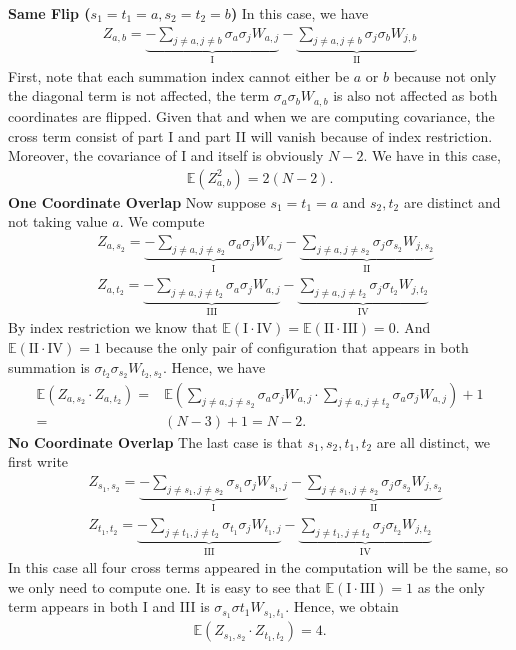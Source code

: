 \documentclass[10pt]{article}
\newcommand{\e}{\mathbb{E}}
\newenvironment{Proof of lemma}{\noindent{\bf Proof of Lemma}}{\hfill$\Box$\newline}
\newenvironment{Proof of claim}{\noindent{\bf Proof of claim}}{\hfill$\Box$\newline}
\newenvironment{Proof of theorem}{\noindent{\bf Proof of Theorem}}{\hfill\scriptsize{$\Box$}\newline}
\newenvironment{Proof of theorems}{\noindent{\bf Proof of Theorems}}{\hfill$\Box$\newline}
\newenvironment{Proof of proposition}{\noindent{\bf Proof of Proposition}}{\hfill$\Box$\newline}
\newenvironment{Proof of propositions}{\noindent{\bf Proof of Propositions}}{\hfill$\Box$\newline}
\newenvironment{Proof of exercise}{\noindent{\it Proof of Exercise:}}{\hfill$\Box$}
\numberwithin{equation}{section}
\begin{document}
\textbf{Same Flip ($s_1 = t_1=a, s_2 = t_2=b$)} In this case, we have
\begin{align}
    Z_{a,b} = \underbrace{- \sum_{j \neq a, j \neq b} \sigma_a \sigma_j W_{a,j}}_\text{I} - \underbrace{\sum_{j \neq a, j \neq b} \sigma_j \sigma_b W_{j,b}}_\text{II}
\end{align}
First, note that each summation index cannot either be $a$ or $b$ because not only the diagonal term is not affected, the term $\sigma_{a}\sigma_{b}W_{a,b}$ is also not affected as both coordinates are flipped. Given that and when we are computing covariance, the cross term consist of part I and part II will vanish because of index restriction. Moreover, the covariance of I and itself is obviously $N-2$. We have in this case,
\begin{align}
    \e(Z_{a,b}^2) = 2(N-2).
\end{align}
\textbf{One Coordinate Overlap} Now suppose $s_1=t_1=a$ and $s_2,t_2$ are distinct and not taking value $a$. We compute
\begin{align}
    &Z_{a,s_2} = \underbrace{- \sum_{j \neq a, j \neq s_2} \sigma_a \sigma_j W_{a,j}}_\text{I} - \underbrace{\sum_{j \neq a, j \neq s_2} \sigma_j \sigma_{s_2} W_{j,s_2}}_\text{II} \\
    &Z_{a,t_2} = \underbrace{- \sum_{j \neq a, j \neq t_2} \sigma_a \sigma_j W_{a,j}}_\text{III} - \underbrace{\sum_{j \neq a, j \neq t_2} \sigma_j \sigma_{t_2} W_{j,t_2}}_\text{IV}
\end{align}
By index restriction we know that $\e(\text{I} \cdot \text{IV}) = \e(\text{II} \cdot \text{III}) = 0$. And $\e(\text{II} \cdot \text{IV}) = 1$ because the only pair of configuration that appears in both summation is $\sigma_{t_2} \sigma_{s_2} W_{t_2,s_2}$. Hence, we have
\begin{align}
    \e(Z_{a,s_2} \cdot Z_{a,t_2}) =& \e\left(\sum_{j \neq a, j \neq s_2} \sigma_a \sigma_j W_{a,j} \cdot \sum_{j \neq a, j \neq t_2} \sigma_a \sigma_j W_{a,j}\right) + 1 \nonumber \\
    =& (N-3) + 1 = N - 2.
\end{align}
\textbf{No Coordinate Overlap} The last case is that $s_1,s_2,t_1,t_2$ are all distinct, we first write
\begin{align}
    &Z_{s_1,s_2} = \underbrace{- \sum_{j \neq s_1, j \neq s_2} \sigma_{s_1} \sigma_j W_{s_1,j}}_\text{I} - \underbrace{\sum_{j \neq s_1, j \neq s_2} \sigma_j \sigma_{s_2} W_{j,s_2}}_\text{II} \\
    &Z_{t_1,t_2} = \underbrace{- \sum_{j \neq t_1, j \neq t_2} \sigma_{t_1} \sigma_j W_{t_1,j}}_\text{III} - \underbrace{\sum_{j \neq t_1, j \neq t_2} \sigma_j \sigma_{t_2} W_{j,t_2}}_\text{IV}
\end{align}
In this case all four cross terms appeared in the computation will be the same, so we only need to compute one. It is easy to see that $\e(\text{I} \cdot \text{III}) = 1$ as the only term appears in both I and III is $\sigma_{s_1} \sigma{t_1} W_{s_1,t_1}$. Hence, we obtain
\begin{align}
    \e(Z_{s_1,s_2} \cdot Z_{t_1,t_2}) = 4.
\end{align}
\end{document}
